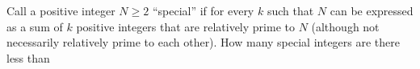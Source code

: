 Call a positive integer $N \ge 2$ ``special'' if for every $k$ such that  $N$ can be expressed as a sum of $k$ positive integers that are relatively prime to $N$ (although not necessarily relatively prime to each other). How many special integers are there less than 